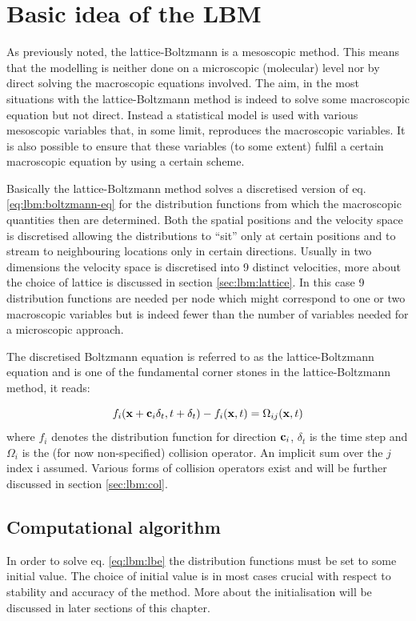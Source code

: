 \section{Basic idea of the LBM}
As previously noted, the lattice-Boltzmann is a mesoscopic
method. This means that the modelling is neither done on a microscopic
(molecular) level nor by direct solving the macroscopic equations
involved. The aim, in the most situations with the lattice-Boltzmann
method is indeed to solve some macroscopic equation but not
direct. Instead a statistical model is used with various mesoscopic
variables that, in some limit, reproduces the macroscopic
variables. It is also possible to ensure that these variables (to some
extent) fulfil a certain macroscopic equation by using a certain
scheme.

Basically the lattice-Boltzmann method solves a discretised version of
eq. \eqref{eq:lbm:boltzmann-eq} for the distribution functions from
which the macroscopic quantities then are determined. Both the spatial
positions and the velocity space is discretised allowing the
distributions to ``sit'' only at certain positions and to stream to
neighbouring locations only in certain directions. Usually in two
dimensions the velocity space is discretised into 9 distinct
velocities, more about the choice of lattice is discussed in section
\ref{sec:lbm:lattice}. In this case 9 distribution functions are
needed per node which might correspond to one or two macroscopic
variables but is indeed fewer than the number of variables needed for
a microscopic approach.

The discretised Boltzmann equation is referred to as the
lattice-Boltzmann equation and is one of the fundamental corner stones
in the lattice-Boltzmann method, it reads:

\begin{equation}\label{eq:lbm:lbe}
f_i(\mathbf{x} + \mathbf{c}_i\delta_t, t + \delta_t) - f_i(\mathbf{x}, t) = \Omega_{ij}(\mathbf{x}, t)
\end{equation}
where $f_i$ denotes the distribution function for direction $\mathbf{c}_i$,
$\delta_t$ is the time step and $\Omega_i$ is the (for now
non-specified) collision operator. An implicit sum over the $j$ index
i assumed. Various forms of collision operators exist and will be
further discussed in section \ref{sec:lbm:col}.

\subsection{Computational algorithm}
In order to solve eq. \eqref{eq:lbm:lbe} the distribution functions
must be set to some initial value. The choice of initial value is in
most cases crucial with respect to stability and accuracy of the
method. More about the initialisation will be discussed in later
sections of this chapter. 

